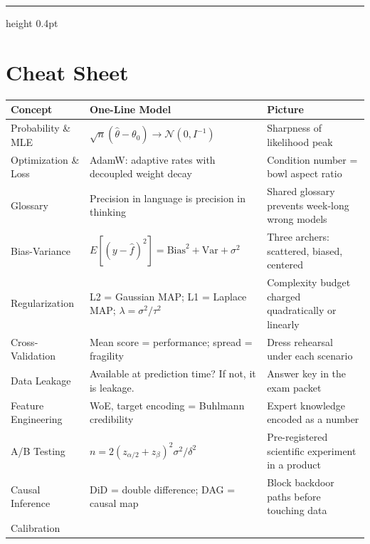 \documentclass[12pt,a4paper]{article}
\begin{document}
\vspace{10pt}\hrule height 0.4pt\vspace{14pt}

\section*{Cheat Sheet}

\begin{center}
\small
\begin{tabular}{@{}p{4.8cm} p{5.2cm} p{4.5cm}@{}}
\toprule
\textbf{Concept} & \textbf{One-Line Model} & \textbf{Picture} \\
\midrule
Probability \& MLE
  & $\sqrt{n}(\hat\theta-\theta_0)\to\mathcal{N}(0,I^{-1})$
  & Sharpness of likelihood peak \\
\addlinespace
Optimization \& Loss
  & AdamW: adaptive rates with decoupled weight decay
  & Condition number = bowl aspect ratio \\
\addlinespace
Glossary
  & Precision in language is precision in thinking
  & Shared glossary prevents week-long wrong models \\
\addlinespace
Bias-Variance
  & $E[(y-\hat f)^2] = \text{Bias}^2 + \text{Var} + \sigma^2$
  & Three archers: scattered, biased, centered \\
\addlinespace
Regularization
  & L2 = Gaussian MAP; L1 = Laplace MAP; $\lambda=\sigma^2/\tau^2$
  & Complexity budget charged quadratically or linearly \\
\addlinespace
Cross-Validation
  & Mean score = performance; spread = fragility
  & Dress rehearsal under each scenario \\
\addlinespace
Data Leakage
  & Available at prediction time? If not, it is leakage.
  & Answer key in the exam packet \\
\addlinespace
Feature Engineering
  & WoE, target encoding = Buhlmann credibility
  & Expert knowledge encoded as a number \\
\addlinespace
A/B Testing
  & $n = 2(z_{\alpha/2}+z_\beta)^2\sigma^2/\delta^2$
  & Pre-registered scientific experiment in a product \\
\addlinespace
Causal Inference
  & DiD = double difference; DAG = causal map
  & Block backdoor paths before touching data \\
\addlinespace
Calibration

\end{tabular}
\end{center}
\end{document}
